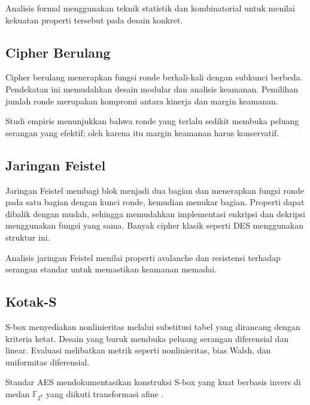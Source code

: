 \documentclass[../main.tex]{subfiles}
\begin{document}
Analisis formal menggunakan teknik statistik dan kombinatorial untuk menilai kekuatan properti tersebut pada desain konkret.

\subsection{Cipher Berulang}
Cipher berulang menerapkan fungsi ronde berkali-kali dengan subkunci berbeda. Pendekatan ini memudahkan desain modular dan analisis keamanan. Pemilihan jumlah ronde merupakan kompromi antara kinerja dan margin keamanan.

Studi empiris menunjukkan bahwa ronde yang terlalu sedikit membuka peluang serangan yang efektif; oleh karena itu margin keamanan harus konservatif.

\subsection{Jaringan Feistel}
Jaringan Feistel membagi blok menjadi dua bagian dan menerapkan fungsi ronde pada satu bagian dengan kunci ronde, kemudian menukar bagian. Properti dapat dibalik dengan mudah, sehingga memudahkan implementasi enkripsi dan dekripsi menggunakan fungsi yang sama. Banyak cipher klasik seperti DES menggunakan struktur ini.

Analisis jaringan Feistel menilai properti avalanche dan resistensi terhadap serangan standar untuk memastikan keamanan memadai.

\subsection{Kotak-S}
S-box menyediakan nonlinieritas melalui substitusi tabel yang dirancang dengan kriteria ketat. Desain yang buruk membuka peluang serangan diferensial dan linear. Evaluasi melibatkan metrik seperti nonlinieritas, bias Walsh, dan uniformitas diferensial.

Standar AES mendokumentasikan konstruksi S-box yang kuat berbasis invers di medan \(\mathbb{F}_{2^8}\) yang diikuti transformasi afine \parencite{fips197}.
\end{document}
